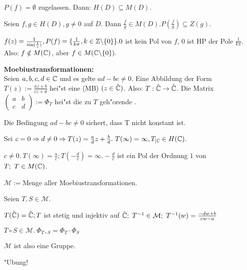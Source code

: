 \documentclass{article}
\begin{document}
\begin{beispiele}
\item $P(f)= \emptyset$ zugelassen. Dann: $H(D) \subseteq M(D)$.
\item Seien $f,g \in H(D), g \not= 0$ auf $D$. Dann $\frac{f}{g} \in M(D). P(\frac{f}{g}) \subseteq Z(g)$.
\item $f(z) = \frac{1}{\sin(\frac{1}{z})}, P(f)= \{\frac{1}{k\pi}, k \in \mathbb{Z} \backslash \{0\}\}. 0$ ist kein Pol von $f$, $0$ ist HP der Pole $\frac1{k\pi}$. Also: $f \notin M(\mathbb{C})$, aber $f \in M(\mathbb{C} \backslash \{0\}).$
\end{beispiele}

{\bf Moebiustransformationen:}\\
Seien $a,b,c,d \in \mathbb{C}$ und es gelte $ad-bc \not= 0$. Eine Abbildung der Form $T(z) := \frac{az+b}{cz+d}$ hei"st eine  (MB) $(z \in \hat{\mathbb{C}})$. Also: $T: \hat{\mathbb{C}} \rightarrow \hat{\mathbb{C}}$. Die Matrix
$\left( \begin{array}{cc}
a & b \\
c & d
\end{array}
\right) := \Phi_T$ hei"st die zu $T$ geh"orende .

\begin{bemerkungen}
\item Die Bedingung $ad-bc \not= 0$ sichert, dass T nicht konstant ist.
\item Sei $c = 0 \Rightarrow d \not= 0 \Rightarrow T(z) = \frac{a}{d}z + \frac{b}{d}.\ T(\infty) = \infty, T_{|\mathbb{C}} \in H(\mathbb{C}).$
\item $c \not= 0.\ T(\infty) = \frac{a}{c}; T(-\frac{d}{c})=\infty. -\frac{d}{c}$ ist ein Pol der Ordnung $1$ von $T;\ T \in M(\mathbb{C})$.
\end{bemerkungen}
$\mathcal{M} := $Menge aller Moebiustransformationen.

\begin{satz}
Seien $T,S \in \mathcal{M}.$
\begin{liste}
\item $T(\hat{\mathbb{C}}) = \hat{\mathbb{C}}; T$ ist stetig und injektiv auf $\hat{\mathbb{C}};\ T^{-1} \in \mathcal{M};\ T^{-1}(w) = \frac{-dw+b}{cw-a}$
\item $T \circ S \in \mathcal{M}.\ \Phi_{T \circ S} = \Phi_T \cdot \Phi_S$
\end{liste}
$\mathcal{M}$ ist also eine Gruppe.
\end{satz}

\begin{beweis}
"Ubung!
\end{beweis}
\end{document}
